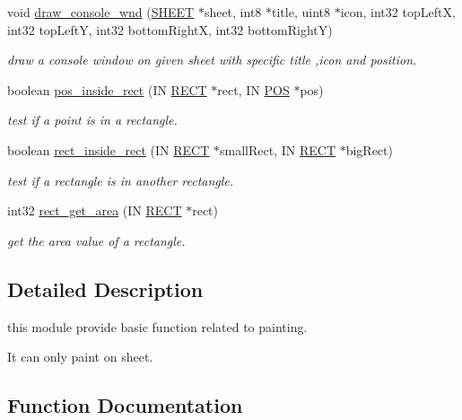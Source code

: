 \begin{DoxyCompactItemize}
void \hyperlink{group__graphic_gaaf9a7159f5033e892e858ea6f03ca1ff}{draw\+\_\+console\+\_\+wnd} (\hyperlink{struct_s_h_e_e_t}{S\+H\+E\+E\+T} $\ast$sheet, int8 $\ast$title, uint8 $\ast$icon, int32 top\+Left\+X, int32 top\+Left\+Y, int32 bottom\+Right\+X, int32 bottom\+Right\+Y)
\begin{DoxyCompactList}\small\item\em draw a console window on given sheet with specific title ,icon and position. \end{DoxyCompactList}\item 
boolean \hyperlink{group__graphic_ga2e34150c7e68e0d3e6dbd28191d302d2}{pos\+\_\+inside\+\_\+rect} (I\+N \hyperlink{struct_r_e_c_t}{R\+E\+C\+T} $\ast$rect, I\+N \hyperlink{struct_p_o_s}{P\+O\+S} $\ast$pos)
\begin{DoxyCompactList}\small\item\em test if a point is in a rectangle. \end{DoxyCompactList}\item 
boolean \hyperlink{group__graphic_ga05cf57d9078877f998474073a36fcdfe}{rect\+\_\+inside\+\_\+rect} (I\+N \hyperlink{struct_r_e_c_t}{R\+E\+C\+T} $\ast$small\+Rect, I\+N \hyperlink{struct_r_e_c_t}{R\+E\+C\+T} $\ast$big\+Rect)
\begin{DoxyCompactList}\small\item\em test if a rectangle is in another rectangle. \end{DoxyCompactList}\item 
int32 \hyperlink{group__graphic_gaf58c750873ec1d9367fde190260008f5}{rect\+\_\+get\+\_\+area} (I\+N \hyperlink{struct_r_e_c_t}{R\+E\+C\+T} $\ast$rect)
\begin{DoxyCompactList}\small\item\em get the area value of a rectangle. \end{DoxyCompactList}\end{DoxyCompactItemize}


\subsection{Detailed Description}
this module provide basic function related to painting. 

It can only paint on sheet. 

\subsection{Function Documentation}
\hypertarget{group__graphic_gaa1b18235958f506c9c99597da1361f92}{}
